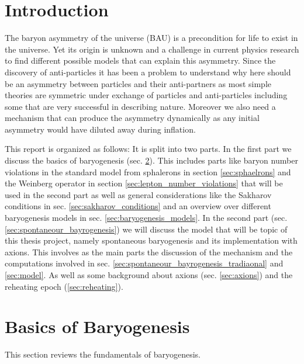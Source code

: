 \documentclass[13pt,a4paper,titlepage]{article}
\begin{document}
\tableofcontents
\newpage

\newcommand{\jana}[1]{{\color{magenta}{#1}}}


\section{Introduction}
\label{sec:introduction}

\noindent
The baryon asymmetry of the universe (BAU) is a precondition for life to exist in the universe.
Yet its origin is unknown and a challenge in current physics research to find different possible models
that can explain this asymmetry.
Since the discovery of anti-particles it has been a problem to understand why here should be
an asymmetry between particles and their anti-partners as most simple theories are symmetric under
exchange of particles and anti-particles including some that are
very successful in describing nature. Moreover we also need a mechanism that can
produce the asymmetry dynamically as any initial asymmetry would have diluted away during inflation.

\noindent
This report is organized as follows: It is split into two parts.
In the first part we discuss the basics of baryogenesis (sec. \ref{sec:basics_of_baryogenesis}).
This includes parts like baryon number violations in the standard model from sphalerons in section
\ref{sec:sphaelrons} and the Weinberg operator in section \ref{sec:lepton_number_violations} that will
be used in the second part as well as general considerations like the Sakharov conditions in sec. \ref{sec:sakharov_conditions} and an overview over different baryogenesis models in sec. \ref{sec:baryogenesis_models}.
In the second part (sec. \ref{sec:spontaneour_bayrogenesis}) we will discuss the model that will be topic of this
thesis project, namely spontaneous baryogenesis and its implementation with axions.
This involves as the main parts the discussion of the mechanism and the computations involved in sec. \ref{sec:spontaneour_bayrogenesis_tradiaonal} and \ref{sec:model}.
As well as some background about axions (sec. \ref{sec:axions}) and the reheating epoch (\ref{sec:reheating}).

\section{Basics of Baryogenesis}
\label{sec:basics_of_baryogenesis}

This section reviews the fundamentals of baryogenesis.
\end{document}
